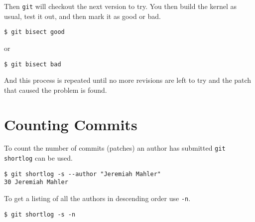 \documentclass{article}
\begin{document}
Then \verb+git+ will checkout the next version to try.  You then build the
kernel as usual, test it out, and then mark it as good or bad.

\begin{verbatim}
$ git bisect good
\end{verbatim}

or

\begin{verbatim}
$ git bisect bad
\end{verbatim}

And this process is repeated until no more revisions are left to try and
the patch that caused the problem is found.

\section{Counting Commits}

To count the number of commits (patches) an author has submitted
\verb+git shortlog+ can be used.

\begin{verbatim}
$ git shortlog -s --author "Jeremiah Mahler"
30 Jeremiah Mahler
\end{verbatim}

To get a listing of all the authors in descending order use \verb+-n+.

\begin{verbatim}
$ git shortlog -s -n
\end{verbatim}

\clearpage
\printbibliography[heading=bibintoc]
\end{document}
